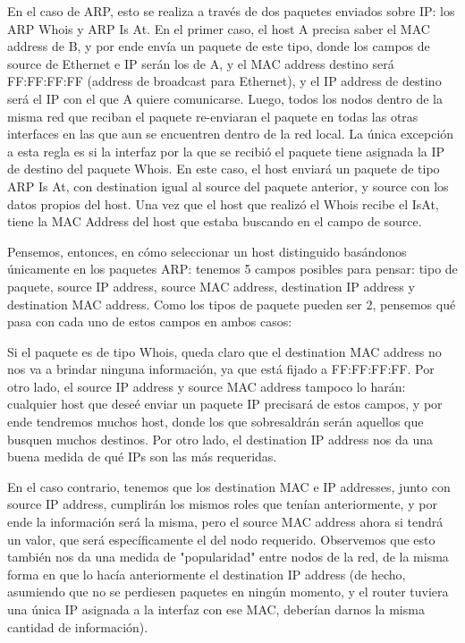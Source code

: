 \documentclass{article}
\theoremstyle{definition}
\theoremstyle{remark}
\begin{document}
En el caso de ARP, esto se realiza a través de dos paquetes enviados sobre IP: los ARP Whois y ARP Is At. En el primer caso, el host A precisa saber el MAC address de B, y por ende envía un paquete de este tipo, donde los campos de source de Ethernet e IP serán los de A, y el MAC address destino será FF:FF:FF:FF (address de broadcast para Ethernet), y el IP address de destino será el IP con el que A quiere comunicarse. Luego, todos los nodos dentro de la misma red que reciban el paquete re-enviaran el paquete en todas las otras interfaces en las que aun se encuentren dentro de la red local. La única excepción a esta regla es si la interfaz por la que se recibió el paquete tiene asignada la IP de destino del paquete Whois. En este caso, el host enviará un paquete de tipo ARP Is At, con destination igual al source del paquete anterior, y source con los datos propios del host. Una vez que el host que realizó el Whois recibe el IsAt, tiene la MAC Address del host que estaba buscando en el campo de source.

Pensemos, entonces, en cómo seleccionar un host distinguido basándonos únicamente en los paquetes ARP: tenemos 5 campos posibles para pensar: tipo de paquete, source IP address, source MAC address, destination IP address y destination MAC address. Como los tipos de paquete pueden ser 2, pensemos qué pasa con cada uno de estos campos en ambos casos:

Si el paquete es de tipo Whois, queda claro que el destination MAC address no nos va a brindar ninguna información, ya que está fijado a FF:FF:FF:FF. Por otro lado, el source IP address y source MAC address tampoco lo harán: cualquier host que deseé enviar un paquete IP precisará de estos campos, y por ende tendremos muchos host, donde los que sobresaldrán serán aquellos que busquen muchos destinos. Por otro lado, el destination IP address nos da una buena medida de qué IPs son las más requeridas.

En el caso contrario, tenemos que los destination MAC e IP addresses, junto con source IP address, cumplirán los mismos roles que tenían anteriormente, y por ende la información será la misma, pero el source MAC address ahora si tendrá un valor, que será específicamente el del nodo requerido. Observemos que esto también nos da una medida de "popularidad" entre nodos de la red, de la misma forma en que lo hacía anteriormente el destination IP address (de hecho, asumiendo que no se perdiesen paquetes en ningún momento, y el router tuviera una única IP asignada a la interfaz con ese MAC, deberían darnos la misma cantidad de información).
\end{document}
